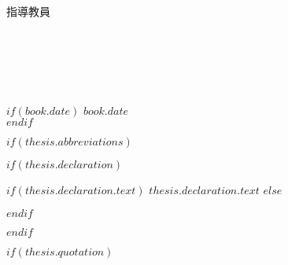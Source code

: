\begin{titlepage}
\begin{center}
\textit{}\\[2.0cm]
\LARGE 指導教員　\supname\\[0.5cm] %
 
\vfill

\textit{}\\[0.5cm]
\LARGE\deptname\\
\LARGE\groupname\\[0.3cm] %
\LARGE\authorname\\[0cm]  %

\vfill



$if(book.date)$
{\large $book.date$}\\[4cm] %
$endif$

 
\vfill
\end{center}
\end{titlepage}


\begingroup
\hypersetup{linkcolor=$if(toclinkcolor)$$toclinkcolor$$else$black$endif$}

\tableofcontents %

\listoffigures %

\listoftables %

\endgroup


$if(thesis.abbreviations)$

$if(thesis.declaration)$
\begin{declaration}
\addchaptertocentry{\authorshipname} %
$if(thesis.declaration.text)$
$thesis.declaration.text$
$else$

$endif$

\end{declaration}

\cleardoublepage
$endif$

$if(thesis.quotation)$

